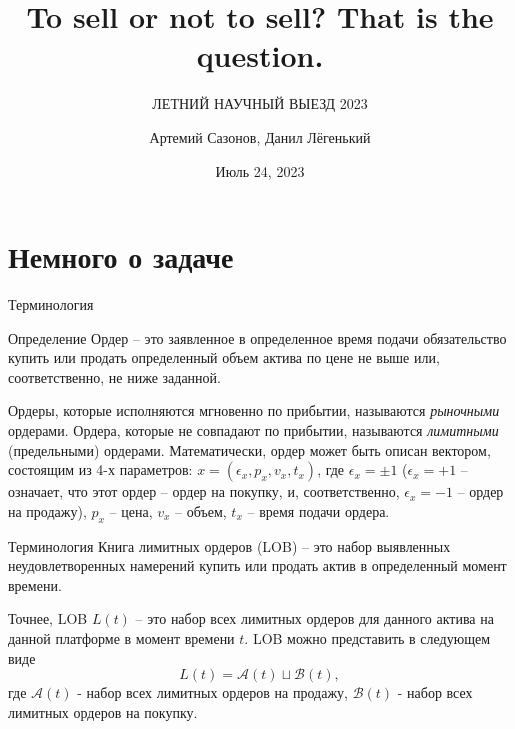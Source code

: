 \documentclass[aspectratio=169]{beamer}
\subtitle{ЛЕТНИЙ НАУЧНЫЙ ВЫЕЗД 2023}
\title{To sell or not to sell? That is the question.}
\author{Артемий Сазонов, Данил Лёгенький}
\institute{Механико-математический факультет МГУ имени М.В. Ломоносова}
\date{Июль 24, 2023}
\begin{document}
    \maketitle

    \section{Немного о задаче}
    
        \begin{frame}{Терминология}
        \begin{block}{Определение}
            Ордер -- это заявленное в определенное время подачи обязательство купить или продать определенный объем актива по цене не выше или, соответственно, не ниже заданной.
        \end{block}
            Ордеры, которые исполняются мгновенно по прибытии, называются \emph{рыночными} ордерами. Ордера, которые не совпадают по прибытии, называются \emph{лимитными} 
            (предельными) ордерами. Математически, ордер может быть описан вектором, состоящим из 4-х параметров: $x = (\epsilon_x, p_x, v_x, t_x) $, где 
            $\epsilon_x = \pm 1 $ ($\epsilon_x = + 1$ -- означает, что этот ордер -- ордер на покупку, и, соответственно, $\epsilon_x = - 1$ -- ордер 
            на продажу), $p_x$ -- цена, $v_x$ -- объем, $t_x$ -- время подачи ордера.
        \end{frame}
        
        \begin{frame}{Терминология}
            Книга лимитных ордеров (LOB) -- это  
            набор выявленных неудовлетворенных намерений купить или продать актив в определенный момент времени.

            Точнее, LOB $L(t)$ -- это набор всех лимитных ордеров для данного актива на данной платформе в момент времени $t$.   
            LOB можно представить в следующем виде
            \begin{equation*}
                L(t) = \mathcal{A}(t) \sqcup \mathcal{B}(t),
            \end{equation*}
            где $\mathcal{A}(t)$ - набор всех лимитных ордеров на продажу, $\mathcal{B}(t)$ - набор всех лимитных ордеров на покупку. 
        \end{frame}
\end{document}
